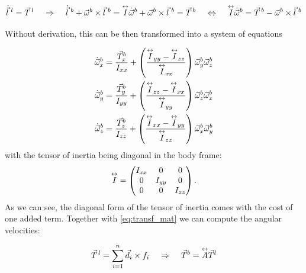  $$
\dot{\vec{l}}^{\,\,l} = \vec{T}^{\,l} 
\hspace{0.4cm} \Rightarrow \hspace{0.4cm}
\dot{\vec{l}}^{\,\,b} + \vec{\omega}^b\times\vec{l}^{\,\,b} = \overset{\leftrightarrow}{I} \dot{\vec{\omega}}^b + \vec{\omega}^b \times \vec{l}^{\,\,b} = \vec{T}^{\,b}
\hspace{0.4cm} \Leftrightarrow \hspace{0.4cm}
\overset{\leftrightarrow}{I} \dot{\vec{\omega}}^b  = \vec{T}^{\,b} - \vec{\omega}^b \times \vec{l}^{\,\,b}
$$

Without derivation, this can be then transformed into a system of equations

\begin{align}
\dot{\vec{\omega}}_x^b &= \frac{\vec{T}^b_x}{I_{xx}} + \left(\frac{\overset{\leftrightarrow}{I}_{yy}-\overset{\leftrightarrow}{I}_{zz}}{\overset{\leftrightarrow}{I}_{xx}}   \right) \vec{\omega}^b_y\vec{\omega}^b_z \\
\dot{\vec{\omega}}_y^b &= \frac{\vec{T}^b_y}{I_{yy}} + \left(\frac{\overset{\leftrightarrow}{I}_{zz}-\overset{\leftrightarrow}{I}_{xx}}{\overset{\leftrightarrow}{I}_{yy}}   \right) \vec{\omega}^b_z\vec{\omega}^b_x \\
\dot{\vec{\omega}}_z^b &= \frac{\vec{T}^b_z}{I_{zz}} + \left(  \frac{\overset{\leftrightarrow}{I}_{xx}-\overset{\leftrightarrow}{I}_{yy}}{\overset{\leftrightarrow}{I}_{zz}}   \right) \vec{\omega}^b_x\vec{\omega}^b_y
\end{align}
with the tensor of inertia being diagonal in the body frame: 
$$\overset{\leftrightarrow}{I} = \begin{pmatrix}
 I_{xx} & 0 & 0\\
 0 & I_{yy} & 0 \\
 0 & 0 & I_{zz}  
\end{pmatrix}. $$ 
As we can see, the diagonal form of the tensor of inertia comes with the cost of one added term. Together with \eqref{eq:transf_mat} we can compute the angular velocities:

$$
\vec{T}^{\,l} = \sum_{i=1}^n   {\vec{d}_i \times f_i} 
\hspace{0.4cm} \Rightarrow \hspace{0.4cm}
\vec{T}^b = \overset{\leftrightarrow}{A}\vec{T}^l
$$


